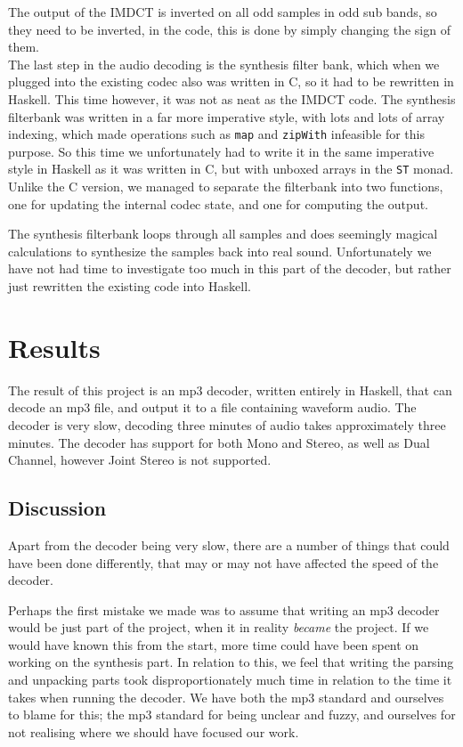 \documentclass[a4paper,12pt]{article}
\begin{document}
        The output of the IMDCT is inverted on all odd samples in odd sub bands,
        so they need to be inverted, in the code, this is done by simply
        changing the sign of them. \\

        The last step in the audio decoding is the synthesis filter bank, which
        when we plugged into the existing codec also was written in C, so it had
        to be rewritten in Haskell. This time however, it was not as neat as the
        IMDCT code. The synthesis filterbank was written in a far more
        imperative style, with lots and lots of array indexing, which made
        operations such as \texttt{map} and \texttt{zipWith} infeasible for this
        purpose. So this time we unfortunately had to write it in the same
        imperative style in Haskell as it was written in C, but with unboxed
        arrays in the \texttt{ST} monad.  Unlike the C version, we managed to
        separate the filterbank into two functions, one for updating the
        internal codec state, and one for computing the output.

        The synthesis filterbank loops through all samples and does seemingly
        magical calculations to synthesize the samples back into real sound.
        Unfortunately we have not had time to investigate too much in this part
        of the decoder, but rather just rewritten the existing code into
        Haskell.

\section{Results}
    The result of this project is an mp3 decoder, written entirely in Haskell,
    that can decode an mp3 file, and output it to a file containing waveform
    audio. The decoder is very slow, decoding three minutes of audio takes
    approximately three minutes. The decoder has support for both Mono and
    Stereo, as well as Dual Channel, however Joint Stereo is not supported.

    \subsection{Discussion}
        Apart from the decoder being very slow, there are a number of things
        that could have been done differently, that may or may not have affected
        the speed of the decoder.

        Perhaps the first mistake we made was to assume that writing an mp3
        decoder would be just part of the project, when it in reality
        \textit{became} the project. If we would have known this from the start,
        more time could have been spent on working on the synthesis part. In
        relation to this, we feel that writing the parsing and unpacking parts
        took disproportionately much time in relation to the time it takes when
        running the decoder. We have both the mp3 standard and ourselves to
        blame for this; the mp3 standard for being unclear and fuzzy, and
        ourselves for not realising where we should have focused our work.
\end{document}
